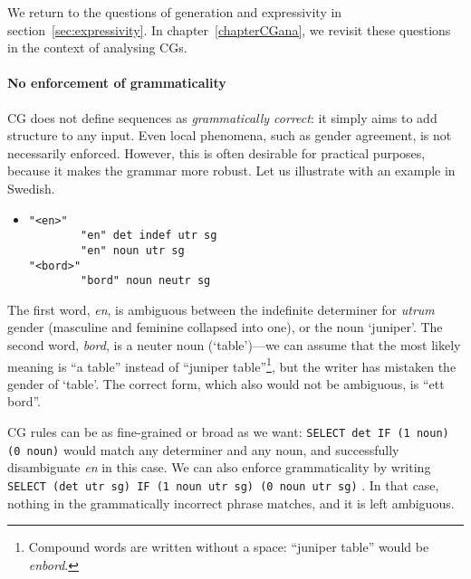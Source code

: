 We return to the questions of generation and expressivity in section~\ref{sec:expressivity}. 
In chapter~\ref{chapterCGana}, we revisit these questions in the context of analysing CGs.

 
\paragraph{No enforcement of grammaticality} 




CG does not define sequences as \emph{grammatically correct}: it simply aims to add structure to any input.
Even local phenomena, such as gender agreement, is not necessarily enforced.
However, this is often desirable for practical purposes, because it makes the grammar more robust.
Let us illustrate with an example in Swedish.

\begin{itemize}
\item[] \begin{verbatim}
"<en>"
        "en" det indef utr sg
        "en" noun utr sg 
"<bord>"
        "bord" noun neutr sg
\end{verbatim}
\end{itemize}

The first word, \emph{en}, is ambiguous between the indefinite determiner for
\emph{utrum} gender  (masculine and feminine collapsed into one), or the noun `juniper'.
The second word, \emph{bord}, is a neuter noun (`table')---we can assume that the
most likely meaning is ``a table'' instead of ``juniper table''\footnote{Compound words are written without a space: ``juniper table'' would be \emph{enbord}.}, but the writer has mistaken the gender of `table'. The correct form, which also would not be ambiguous, is ``ett bord''.

CG rules can be as fine-grained or broad as we want: 
\texttt{SELECT det IF (1 noun) (0 noun)} would match any determiner and any noun, 
and successfully disambiguate \emph{en} in this case. 
We can also enforce grammaticality by writing \texttt{SELECT (det~utr~sg) IF (1~noun~utr~sg) (0~noun~utr~sg)}%
. In that case, nothing in the grammatically incorrect phrase matches, and it is left ambiguous.



